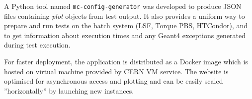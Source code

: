 A Python tool named {\tt mc-config-generator} was developed to produce JSON files containing \textit{plot} objects from test output. It also provides a uniform way to prepare and run tests on the batch system (LSF, Torque PBS, HTCondor), and to get information about execution times and any Geant4 exceptions generated during test execution.

For faster deployment, the application is distributed as a Docker image which is hosted on virtual machine provided by CERN VM service. The website is optimised for asynchronous access and plotting and can be easily scaled ''horizontally'' by launching new instances.%